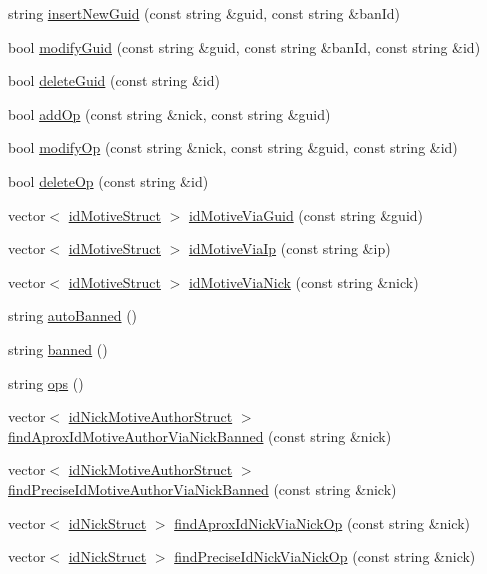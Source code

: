 \begin{DoxyCompactItemize}
\item 
string \hyperlink{class_db_addfac0834d040949a8244ac0db26ffe1}{insertNewGuid} (const string \&guid, const string \&banId)
\item 
bool \hyperlink{class_db_a671ae72799227d9c519e8c3c8aa880e0}{modifyGuid} (const string \&guid, const string \&banId, const string \&id)
\item 
bool \hyperlink{class_db_a5a00674bd7668258eba41f67d54985e7}{deleteGuid} (const string \&id)
\item 
bool \hyperlink{class_db_ac71fad8e18bfcbb2d9d4677705871993}{addOp} (const string \&nick, const string \&guid)
\item 
bool \hyperlink{class_db_a187097657b9e5e93746dd0e70defb408}{modifyOp} (const string \&nick, const string \&guid, const string \&id)
\item 
bool \hyperlink{class_db_ab2b3952627f56b685a231bb193cd4b15}{deleteOp} (const string \&id)
\item 
vector$<$ \hyperlink{struct_db_1_1id_motive_struct}{idMotiveStruct} $>$ \hyperlink{class_db_a006fbbb6e0effda9244ec3686af8303d}{idMotiveViaGuid} (const string \&guid)
\item 
vector$<$ \hyperlink{struct_db_1_1id_motive_struct}{idMotiveStruct} $>$ \hyperlink{class_db_ac3cf9665aa87da644f88501a387a311b}{idMotiveViaIp} (const string \&ip)
\item 
vector$<$ \hyperlink{struct_db_1_1id_motive_struct}{idMotiveStruct} $>$ \hyperlink{class_db_a6e0c00ac7c40876546d431a2898f386b}{idMotiveViaNick} (const string \&nick)
\item 
string \hyperlink{class_db_a1ffb585d576026c71c1330fac0e47b62}{autoBanned} ()
\item 
string \hyperlink{class_db_aa8d531451d40abe8df07df362f66d5c1}{banned} ()
\item 
string \hyperlink{class_db_a59621119e12ef6662c1991da4b605ecd}{ops} ()
\item 
vector$<$ \hyperlink{struct_db_1_1id_nick_motive_author_struct}{idNickMotiveAuthorStruct} $>$ \hyperlink{class_db_a763e54a6135a7d48f64b5d7a0e6b8904}{findAproxIdMotiveAuthorViaNickBanned} (const string \&nick)
\item 
vector$<$ \hyperlink{struct_db_1_1id_nick_motive_author_struct}{idNickMotiveAuthorStruct} $>$ \hyperlink{class_db_ab86ed4e818aeb037188f269ae27a3224}{findPreciseIdMotiveAuthorViaNickBanned} (const string \&nick)
\item 
vector$<$ \hyperlink{struct_db_1_1id_nick_struct}{idNickStruct} $>$ \hyperlink{class_db_a1d2e4679fb5ed49f149e0003d4867d45}{findAproxIdNickViaNickOp} (const string \&nick)
\item 
vector$<$ \hyperlink{struct_db_1_1id_nick_struct}{idNickStruct} $>$ \hyperlink{class_db_a3b20942e41dc3bf1dd6f0dc82fcd7904}{findPreciseIdNickViaNickOp} (const string \&nick)
\end{DoxyCompactItemize}


